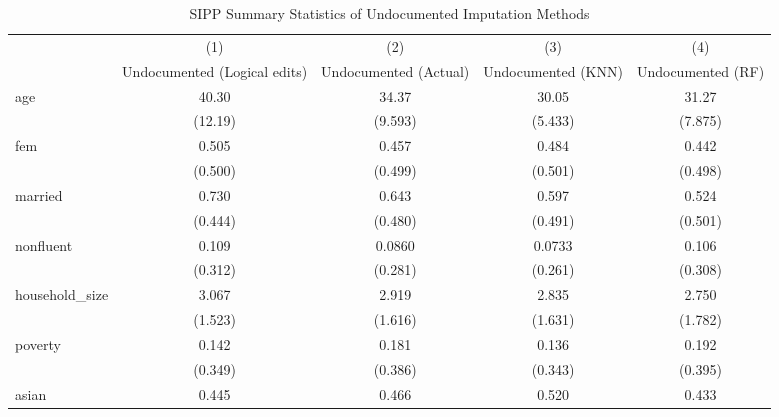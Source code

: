 \begin{table}[htbp]\centering
\def\sym#1{\ifmmode^{#1}\else\(^{#1}\)\fi}
\caption{SIPP Summary Statistics of Undocumented Imputation Methods \label{tab:sum}}
\begin{tabular}{l*{4}{c}}
\hline\hline
                    &\multicolumn{1}{c}{(1)}         &\multicolumn{1}{c}{(2)}         &\multicolumn{1}{c}{(3)}         &\multicolumn{1}{c}{(4)}         \\
                    &Undocumented (Logical edits)         &Undocumented (Actual)         &Undocumented (KNN)         &Undocumented (RF)         \\
\hline
age                 &       40.30         &       34.37         &       30.05         &       31.27         \\
                    &     (12.19)         &     (9.593)         &     (5.433)         &     (7.875)         \\
[1em]
fem                 &       0.505         &       0.457         &       0.484         &       0.442         \\
                    &     (0.500)         &     (0.499)         &     (0.501)         &     (0.498)         \\
[1em]
married             &       0.730         &       0.643         &       0.597         &       0.524         \\
                    &     (0.444)         &     (0.480)         &     (0.491)         &     (0.501)         \\
[1em]
nonfluent           &       0.109         &      0.0860         &      0.0733         &       0.106         \\
                    &     (0.312)         &     (0.281)         &     (0.261)         &     (0.308)         \\
[1em]
household\_size      &       3.067         &       2.919         &       2.835         &       2.750         \\
                    &     (1.523)         &     (1.616)         &     (1.631)         &     (1.782)         \\
[1em]
poverty             &       0.142         &       0.181         &       0.136         &       0.192         \\
                    &     (0.349)         &     (0.386)         &     (0.343)         &     (0.395)         \\
[1em]
asian               &       0.445         &       0.466         &       0.520         &       0.433         \\

\end{tabular}
\end{table}

